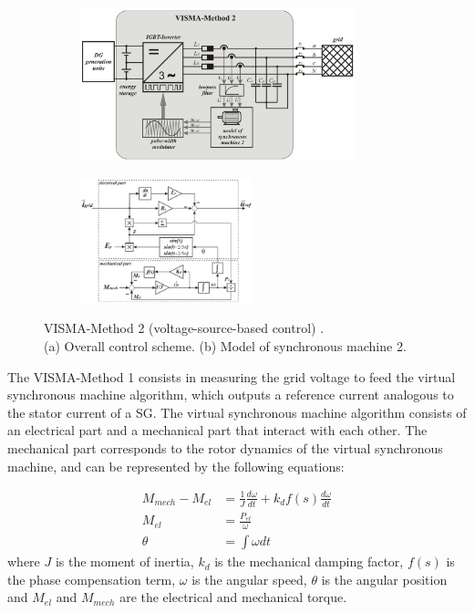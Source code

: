 \begin{figure}[ht!]
    \centering
    \begin{subfigure}[b]{\textwidth}
        \centering
        \includegraphics[width=8cm]{images/VISMA2Concept.png}
        \caption{}
        \label{fig:VISMA2Concept}
    \end{subfigure}

    \begin{subfigure}[b]{\textwidth}
        \centering
        \includegraphics[width=5cm]{images/VISMA2block.png}
        \caption{}
        \label{fig:VISMA2block}
    \end{subfigure}
    \label{fig:VISMA2}
    \caption{VISMA-Method 2 (voltage-source-based control) \cite{chen2012comparison}.\\ (a) Overall control scheme. (b) Model of synchronous machine 2.}
\end{figure}

\newpage
The VISMA-Method 1 consists in measuring the grid voltage to feed the virtual
synchronous machine algorithm, which outputs a reference current analogous to
the stator current of a SG. The virtual synchronous machine algorithm consists
of an electrical part and a mechanical part that interact with each other. The
mechanical part corresponds to the rotor dynamics of the virtual synchronous
machine, and can be represented by the following equations:

\begin{equation*}
    \begin{aligned}
        M_{mech} - M_{el} &= \frac{1}{J} \frac{d\omega}{dt} + k_d f(s) \frac{d\omega}{dt}\\
        M_{el} &= \frac{P_{el}}{\omega}\\
        \theta &= \int \omega dt
    \end{aligned}
\end{equation*}
\noindent where $J$ is the moment of inertia, $k_d$ is the mechanical damping
factor, $f(s)$ is the phase compensation term, $\omega$ is the angular speed,
$\theta$ is the angular position and $M_{el}$ and $M_{mech}$ are the electrical
and mechanical torque.

